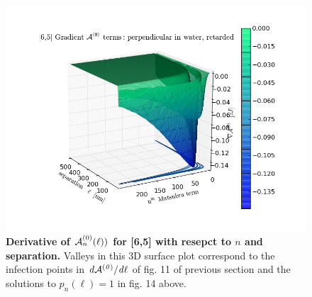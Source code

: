 \documentclass[a4paper]{article}
\begin{document}
\begin{center}
\begin{figure}[t!]
\begin{center}
\includegraphics[width=1.4\textwidth]{plots/grad_A0_65.png}
\hskip 43pt
\caption{{\bf Derivative of ${\cal A}_{n}^{(0)}(\ell))$ for [6,5] with resepct to
$n$ and separation.}  Valleys in this 3D surface plot correspond to the
infection points in $\it{d}{\cal A}^{(0)}/\it{d}\ell$ of fig. 11 of previous
section and the solutions to  $p_n(\ell)=1$ in fig. 14 above.}
\label{eiz65}
\end{center}
\end{figure} 
\end{center}
%
\end{document}
